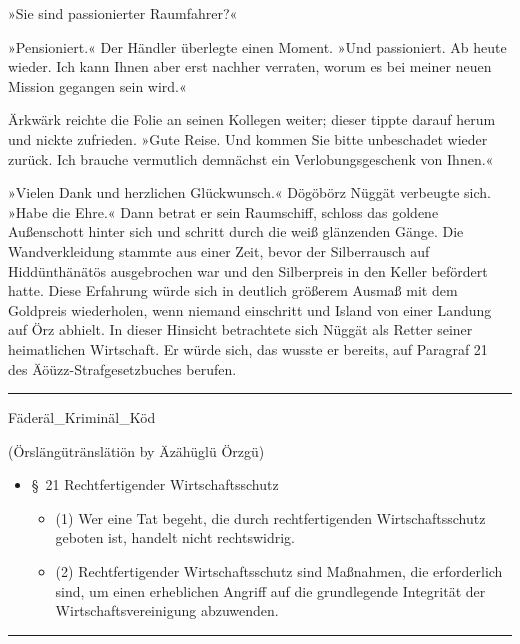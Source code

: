 »Sie sind passionierter Raumfahrer?«

»Pensioniert.« Der Händler überlegte einen Moment. »Und passioniert. Ab heute wieder. Ich kann Ihnen aber erst nachher verraten, worum es bei meiner neuen Mission gegangen sein wird.«

Ärkwärk reichte die Folie an seinen Kollegen weiter; dieser tippte darauf herum und nickte zufrieden. »Gute Reise. Und kommen Sie bitte unbeschadet wieder zurück. Ich brauche vermutlich demnächst ein Verlobungsgeschenk von Ihnen.«

»Vielen Dank und herzlichen Glückwunsch.« Dögöbörz Nüggät verbeugte sich. »Habe die Ehre.« Dann betrat er sein Raumschiff, schloss das goldene Außenschott hinter sich und schritt durch die weiß glänzenden Gänge. Die Wandverkleidung stammte aus einer Zeit, bevor der Silberrausch auf Hiddünthänätös ausgebrochen war und den Silberpreis in den Keller befördert hatte. Diese Erfahrung würde sich in deutlich größerem Ausmaß mit dem Goldpreis wiederholen, wenn niemand einschritt und Island von einer Landung auf Örz abhielt. In dieser Hinsicht betrachtete sich Nüggät als Retter seiner heimatlichen Wirtschaft. Er würde sich, das wusste er bereits, auf Paragraf 21 des Äöüzz-Strafgesetzbuches berufen.

\noindent \parbox{\textwidth}{ \vspace{3ex} \hrule \vspace{3ex}

\noindent Fäderäl\_Kriminäl\_Köd

\noindent (Örslängütränslätiön by Äzähüglü Örzgü)

\begin{itemize}
    \item[] §~21 Rechtfertigender Wirtschaftsschutz
    \begin{itemize}
        \item[] (1) Wer eine Tat begeht, die durch rechtfertigenden Wirtschaftsschutz geboten ist, handelt nicht rechtswidrig.
    \end{itemize}
    \begin{itemize}
        \item[] (2) Rechtfertigender Wirtschaftsschutz sind Maßnahmen, die erforderlich sind, um einen erheblichen Angriff auf die grundlegende Integrität der Wirtschaftsvereinigung abzuwenden.
    \end{itemize}
\end{itemize}

\vspace{3ex} \hrule \vspace{3ex} }

